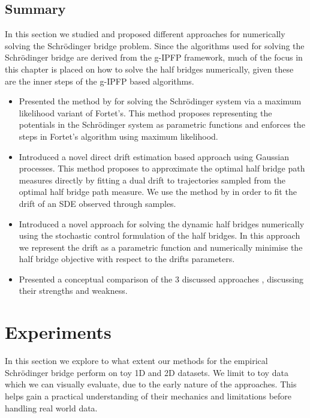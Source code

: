 \documentclass[a4paper,12pt,twoside,openright]{report}
\theoremstyle{definition}
\begin{document}
\section{Summary}

In this section we studied and proposed different approaches for numerically solving the Schrödinger bridge problem. Since the algorithms used for solving the Schrödinger bridge are derived from the g-IPFP framework, much of the focus in this chapter is placed on how to solve the half bridges numerically, given these are the inner steps of the g-IPFP based algorithms. 

\begin{itemize}
    \item Presented the method by \cite{pavon2018data} for solving the  Schrödinger system via a maximum likelihood variant of Fortet's. This method proposes representing the potentials in the Schrödinger system as parametric functions and enforces the steps in Fortet's algorithm using maximum likelihood.
    \item Introduced a novel direct drift estimation based approach using Gaussian processes. This method proposes to approximate the optimal half bridge path measures directly by fitting a dual drift to trajectories sampled from the optimal half bridge path measure. We use the method by \cite{ruttor2013approximate} in order to fit the drift of an SDE observed through samples.
    \item Introduced a novel approach for solving the dynamic half bridges numerically using the stochastic control formulation of the half bridges. In this approach we represent the drift as a parametric function and numerically minimise the half bridge objective with respect to the drifts parameters. 
    \item Presented a conceptual comparison of the 3 discussed approaches , discussing their strengths and weakness. 
\end{itemize}
\chapter{Experiments}

In this section we explore to what extent our methods for the empirical Schrödinger bridge perform on toy 1D and 2D datasets. We limit to toy data which we can visually evaluate, due to the early nature of the approaches. This helps gain a practical understanding of their mechanics and limitations before handling real world data. 
\end{document}
